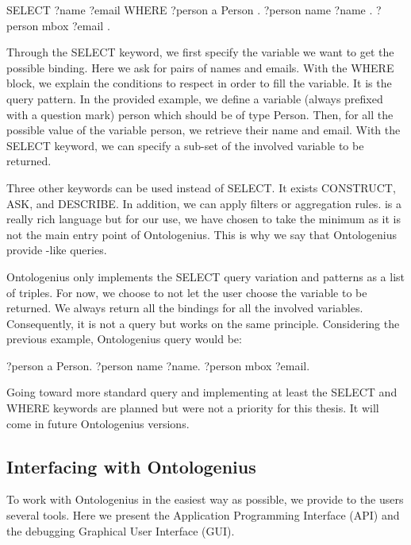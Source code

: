 \begin{verbatimtab}
SELECT ?name 
       ?email
WHERE
  {
    ?person  a     Person .
    ?person  name  ?name .
    ?person  mbox  ?email .
  }
\end{verbatimtab}

Through the SELECT keyword, we first specify the variable we want to get the possible binding. Here we ask for pairs of names and emails. With the WHERE block, we explain the conditions to respect in order to fill the variable. It is the query pattern. In the provided example, we define a variable (always prefixed with a question mark) person which should be of type Person. Then, for all the possible value of the variable person, we retrieve their name and email. With the SELECT keyword, we can specify a sub-set of the involved variable to be returned.

Three other keywords can be used instead of SELECT. It exists CONSTRUCT, ASK, and DESCRIBE. In addition, we can apply filters or aggregation rules. \sparql{} is a really rich language but for our use, we have chosen to take the minimum as it is not the main entry point of Ontologenius. This is why we say that Ontologenius provide \sparql{}-like queries.

Ontologenius only implements the SELECT query variation and patterns as a list of triples. For now, we choose to not let the user choose the variable to be returned. We always return all the bindings for all the involved variables. Consequently, it is not a \sparql{} query but works on the same principle. Considering the previous example, Ontologenius query would be:

\begin{verbatimtab}
?person a Person. ?person name ?name. ?person mbox ?email.
\end{verbatimtab}

Going toward more standard query and implementing at least the SELECT and WHERE keywords are planned but were not a priority for this thesis. It will come in future Ontologenius versions.

\subsection{Interfacing with Ontologenius}

To work with Ontologenius in the easiest way as possible, we provide to the users several tools. Here we present the Application Programming Interface (API) and the debugging Graphical User Interface (GUI).

